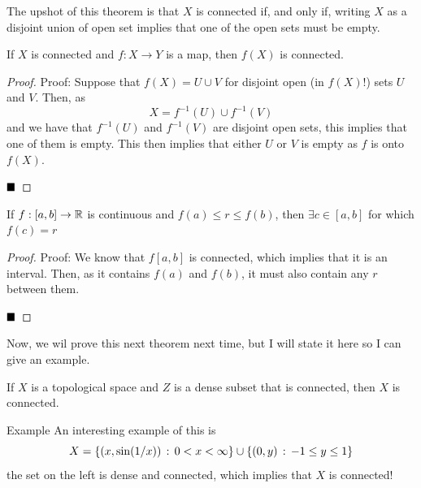 The upshot of this theorem is that $X$ is connected if, and only if, writing $X$ as a disjoint union of open set implies that one of the open sets must be empty.

\begin{lemma}
    If $X$ is connected and $f : X \to Y$ is a map, then $f(X)$ is connected. 
\end{lemma}
\begin{proof}{Proof:}
    Suppose that $f(X) = U \cup V$ for disjoint open (in $f(X)$!) sets $U$ and $V$. Then, as 
    \[ X = f^{-1}(U) \cup f^{-1}(V) \]
    and we have that $f^{-1}(U)$ and $f^{-1}(V)$ are disjoint open sets, this implies that one of them is empty. This then implies that either $U$ or $V$ is empty as $f$ is onto $f(X)$. 

    $\qed$
\end{proof}

\begin{lemma}
    If $f : [a, b] \to \mathbb{R}$ is continuous and $f(a) \leq r \leq f(b)$, then $\exists c \in [a, b]$ for which $f(c) = r$
\end{lemma}
\begin{proof}{Proof:}
    We know that $f[a, b]$ is connected, which implies that it is an interval. Then, as it contains $f(a)$ and $f(b)$, it must also contain any $r$ between them. 

    $\qed$
\end{proof}

Now, we wil prove this next theorem next time, but I will state it here so I can give an example.

\begin{lemma}
    If $X$ is a topological space and $Z$ is a dense subset that is connected, then $X$ is connected.
\end{lemma}

\begin{example}{Example}
    An interesting example of this is 
    \[ X = \{(x, \sin(1/x)) \, :\, 0 < x < \infty\} \cup \{(0, y) \, :\, -1 \leq y \leq 1\} \]
    the set on the left is dense and connected, which implies that $X$ is connected!
\end{example}